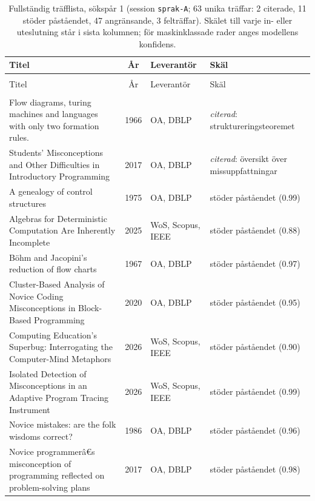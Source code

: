 \begingroup\footnotesize
\begin{longtable}{@{}%
  >{\raggedright\arraybackslash}p{}c%
  >{\raggedright\arraybackslash}p{}%
  >{\raggedright\arraybackslash}p{}@{}}
\caption{Fullständig träfflista, sökspår 1 (session \texttt{sprak-A};
63 unika träffar: 2 citerade, 11 stöder påståendet,
47 angränsande, 3 felträffar).  Skälet till varje in- eller
uteslutning står i sista kolumnen; för maskinklassade rader anges modellens
konfidens.}\label{tab:sok-A}\\
\toprule
Titel & År & Leverantör & Skäl \\
\midrule
\endfirsthead
\multicolumn{4}{@{}l}{\emph{\tablename~\thetable{} (forts.)}}\\
\toprule Titel & År & Leverantör & Skäl \\ \midrule
\endhead
\midrule \multicolumn{4}{r@{}}{\emph{forts.\ på nästa sida}}\\
\endfoot
\bottomrule
\endlastfoot
Flow diagrams, turing machines and languages with only two formation rules. & 1966 & OA, DBLP & \emph{citerad}: struktureringsteoremet \\
Students' Misconceptions and Other Difficulties in Introductory Programming & 2017 & OA, DBLP & \emph{citerad}: översikt över missuppfattningar \\
A genealogy of control structures & 1975 & OA, DBLP & stöder påståendet (0.99) \\
Algebras for Deterministic Computation Are Inherently Incomplete & 2025 & WoS, Scopus, IEEE & stöder påståendet (0.88) \\
Böhm and Jacopini's reduction of flow charts & 1967 & OA, DBLP & stöder påståendet (0.97) \\
Cluster-Based Analysis of Novice Coding Misconceptions in Block-Based Programming & 2020 & OA, DBLP & stöder påståendet (0.95) \\
Computing Education's Superbug: Interrogating the Computer-Mind Metaphors & 2026 & WoS, Scopus, IEEE & stöder påståendet (0.90) \\
Isolated Detection of Misconceptions in an Adaptive Program Tracing Instrument & 2026 & WoS, Scopus, IEEE & stöder påståendet (0.99) \\
Novice mistakes: are the folk wisdoms correct? & 1986 & OA, DBLP & stöder påståendet (0.96) \\
Novice programmerâ€s misconception of programming reflected on problem-solving plans & 2017 & OA, DBLP & stöder påståendet (0.98) \\

\end{longtable}
